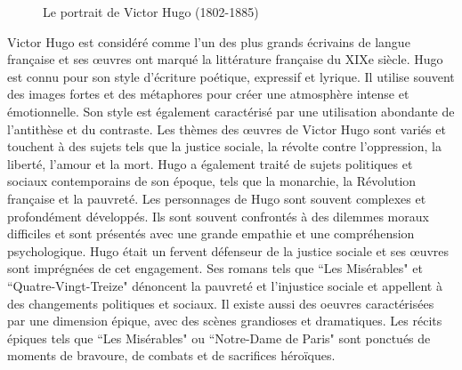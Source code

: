 \documentclass[UTF8,a4paper,12pt]{ctexart}
\numberwithin{equation}{section}
\newcommand{\mycite}[1]{\cite{#1}}
\begin{document}
\begin{figure}[H] 
\caption{Le portrait de Victor Hugo (1802-1885)}
\end{figure}
  Victor Hugo est considéré comme l'un des plus grands écrivains de langue française et ses œuvres ont marqué la littérature française du XIXe siècle. Hugo est connu pour son style d'écriture poétique, expressif et lyrique. Il utilise souvent des images fortes et des métaphores pour créer une atmosphère intense et émotionnelle. Son style est également caractérisé par une utilisation abondante de l'antithèse et du contraste. Les thèmes des œuvres de Victor Hugo sont variés et touchent à des sujets tels que la justice sociale, la révolte contre l'oppression, la liberté, l'amour et la mort\mycite{abc}. Hugo a également traité de sujets politiques et sociaux contemporains de son époque, tels que la monarchie, la Révolution française et la pauvreté. Les personnages de Hugo sont souvent complexes et profondément développés. Ils sont souvent confrontés à des dilemmes moraux difficiles et sont présentés avec une grande empathie et une compréhension psychologique. Hugo était un fervent défenseur de la justice sociale et ses œuvres sont imprégnées de cet engagement. Ses romans tels que ``Les Misérables" et ``Quatre-Vingt-Treize" dénoncent la pauvreté et l'injustice sociale et appellent à des changements politiques et sociaux. Il existe aussi des oeuvres caractérisées par une dimension épique, avec des scènes grandioses et dramatiques. Les récits épiques tels que ``Les Misérables"\mycite{hugo1863miserables} ou ``Notre-Dame de Paris"\mycite{hugo1904notre} sont ponctués de moments de bravoure, de combats et de sacrifices héroïques.
\end{document}
